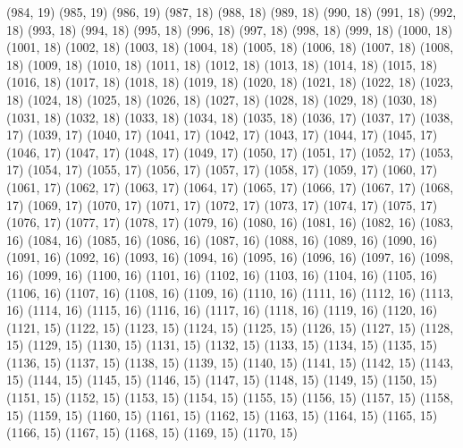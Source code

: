 {   (984, 19)
   (985, 19)
   (986, 19)
   (987, 18)
   (988, 18)
   (989, 18)
   (990, 18)
   (991, 18)
   (992, 18)
   (993, 18)
   (994, 18)
   (995, 18)
   (996, 18)
   (997, 18)
   (998, 18)
   (999, 18)
   (1000, 18)
   (1001, 18)
   (1002, 18)
   (1003, 18)
   (1004, 18)
   (1005, 18)
   (1006, 18)
   (1007, 18)
   (1008, 18)
   (1009, 18)
   (1010, 18)
   (1011, 18)
   (1012, 18)
   (1013, 18)
   (1014, 18)
   (1015, 18)
   (1016, 18)
   (1017, 18)
   (1018, 18)
   (1019, 18)
   (1020, 18)
   (1021, 18)
   (1022, 18)
   (1023, 18)
   (1024, 18)
   (1025, 18)
   (1026, 18)
   (1027, 18)
   (1028, 18)
   (1029, 18)
   (1030, 18)
   (1031, 18)
   (1032, 18)
   (1033, 18)
   (1034, 18)
   (1035, 18)
   (1036, 17)
   (1037, 17)
   (1038, 17)
   (1039, 17)
   (1040, 17)
   (1041, 17)
   (1042, 17)
   (1043, 17)
   (1044, 17)
   (1045, 17)
   (1046, 17)
   (1047, 17)
   (1048, 17)
   (1049, 17)
   (1050, 17)
   (1051, 17)
   (1052, 17)
   (1053, 17)
   (1054, 17)
   (1055, 17)
   (1056, 17)
   (1057, 17)
   (1058, 17)
   (1059, 17)
   (1060, 17)
   (1061, 17)
   (1062, 17)
   (1063, 17)
   (1064, 17)
   (1065, 17)
   (1066, 17)
   (1067, 17)
   (1068, 17)
   (1069, 17)
   (1070, 17)
   (1071, 17)
   (1072, 17)
   (1073, 17)
   (1074, 17)
   (1075, 17)
   (1076, 17)
   (1077, 17)
   (1078, 17)
   (1079, 16)
   (1080, 16)
   (1081, 16)
   (1082, 16)
   (1083, 16)
   (1084, 16)
   (1085, 16)
   (1086, 16)
   (1087, 16)
   (1088, 16)
   (1089, 16)
   (1090, 16)
   (1091, 16)
   (1092, 16)
   (1093, 16)
   (1094, 16)
   (1095, 16)
   (1096, 16)
   (1097, 16)
   (1098, 16)
   (1099, 16)
   (1100, 16)
   (1101, 16)
   (1102, 16)
   (1103, 16)
   (1104, 16)
   (1105, 16)
   (1106, 16)
   (1107, 16)
   (1108, 16)
   (1109, 16)
   (1110, 16)
   (1111, 16)
   (1112, 16)
   (1113, 16)
   (1114, 16)
   (1115, 16)
   (1116, 16)
   (1117, 16)
   (1118, 16)
   (1119, 16)
   (1120, 16)
   (1121, 15)
   (1122, 15)
   (1123, 15)
   (1124, 15)
   (1125, 15)
   (1126, 15)
   (1127, 15)
   (1128, 15)
   (1129, 15)
   (1130, 15)
   (1131, 15)
   (1132, 15)
   (1133, 15)
   (1134, 15)
   (1135, 15)
   (1136, 15)
   (1137, 15)
   (1138, 15)
   (1139, 15)
   (1140, 15)
   (1141, 15)
   (1142, 15)
   (1143, 15)
   (1144, 15)
   (1145, 15)
   (1146, 15)
   (1147, 15)
   (1148, 15)
   (1149, 15)
   (1150, 15)
   (1151, 15)
   (1152, 15)
   (1153, 15)
   (1154, 15)
   (1155, 15)
   (1156, 15)
   (1157, 15)
   (1158, 15)
   (1159, 15)
   (1160, 15)
   (1161, 15)
   (1162, 15)
   (1163, 15)
   (1164, 15)
   (1165, 15)
   (1166, 15)
   (1167, 15)
   (1168, 15)
   (1169, 15)
   (1170, 15)
}
